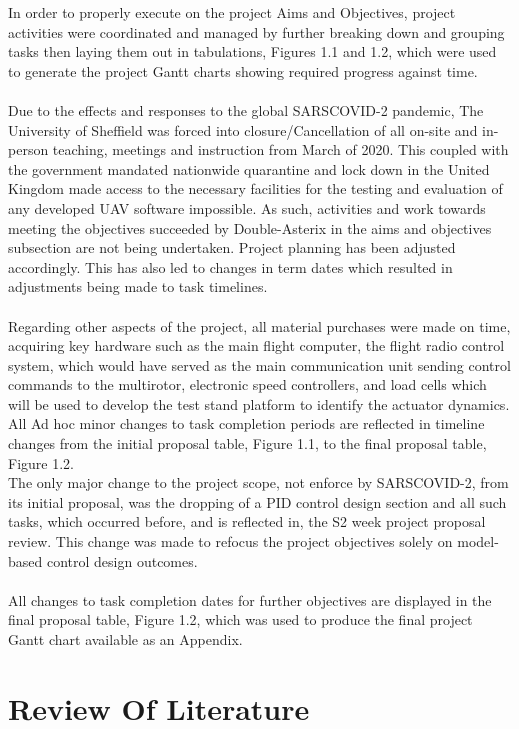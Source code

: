\documentclass[12pt,a4paper,twoside]{report}
\begin{document}
			In order to properly execute on the project Aims and Objectives, project activities were coordinated and managed by further breaking down and grouping tasks then laying them out in tabulations, Figures 1.1 and 1.2, which were used to generate the project Gantt charts showing required progress against time.
			\\ \\
			Due to the effects and responses to the global SARSCOVID-2 pandemic, The University of Sheffield was forced into closure/Cancellation of all on-site and in-person teaching, meetings and instruction from March of 2020. This coupled with the government mandated nationwide quarantine and lock down in the United Kingdom made access to the necessary facilities for the testing and evaluation of any developed UAV software impossible. As such, activities and work towards meeting the objectives succeeded by Double-Asterix in the aims and objectives subsection are not being undertaken. Project planning has been adjusted accordingly. This has also led to changes in term dates which resulted in adjustments being made to task timelines.
			\\ \\
			Regarding other aspects of the project, all material purchases were made on time, acquiring key hardware such as the main flight computer, the flight radio control system, which would have served as the main communication unit sending control commands to the multirotor, electronic speed controllers, and load cells which will be used to develop the test stand platform to identify the actuator dynamics. All Ad hoc minor changes to task completion periods are reflected in timeline changes from the initial proposal table, Figure 1.1, to the final proposal table, Figure 1.2. 
			\\
			The only major change to the project scope, not enforce by SARSCOVID-2, from its initial proposal, was the dropping of a PID control design section and all such tasks, which occurred before, and is reflected in, the S2 week project proposal review. This change was made to refocus the project objectives solely on model-based control design outcomes.
			\\ \\
			All changes to task completion dates for further objectives are displayed in the final proposal table, Figure 1.2, which was used to produce the final project Gantt chart available as an Appendix.
			
	\newpage
	
	\chapter{Review Of Literature}	
	
\end{document}
